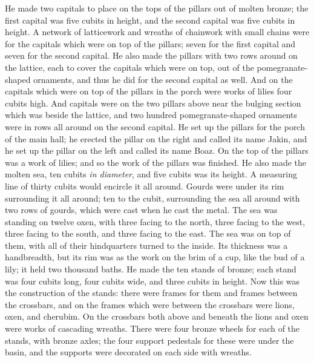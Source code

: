 \begin{biblechapter}
\verse He made two capitals to place on the tops of the pillars out of molten bronze; the first capital was five cubits in height, and the second capital was five cubits in height.
\verse A network of latticework and wreaths of chainwork with small chains were for the capitals which were on top of the pillars; seven for the first capital and seven for the second capital.
\verse He also made the pillars with two rows around on the lattice, each to cover the capitals which were on top, out of the pomegranate-shaped ornaments, and thus he did for the second capital as well.
\verse And on the capitals which were on top of the pillars in the porch were works of lilies four cubits high.
\verse And capitals were on the two pillars above near the bulging section which was beside the lattice, and two hundred pomegranate-shaped ornaments were in rows all around on the second capital.
\verse He set up the pillars for the porch of the main hall; he erected the pillar on the right and called its name Jakin, and he set up the pillar on the left and called its name Boaz.
\verse On the top of the pillars was a work of lilies; and so the work of the pillars was finished.
\verse He also made the molten sea, ten cubits \textit{in diameter}, and five cubits was its height. A measuring line of thirty cubits would encircle it all around.
\verse Gourds were under its rim surrounding it all around; ten to the cubit, surrounding the sea all around with two rows of gourds, which were cast when he cast the metal.
\verse The sea was standing on twelve oxen, with three facing to the north, three facing to the west, three facing to the south, and three facing to the east. The sea was on top of them, with all of their hindquarters turned to the inside.
\verse Its thickness was a handbreadth, but its rim was as the work on the brim of a cup, like the bud of a lily; it held two thousand baths.
\verse He made the ten stands of bronze; each stand was four cubits long, four cubits wide, and three cubits in height.
\verse Now this was the construction of the stands: there were frames for them and frames between the crossbars,
\verse and on the frames which were between the crossbars were lions, oxen, and cherubim. On the crossbars both above and beneath the lions and oxen were works of cascading wreaths.
\verse There were four bronze wheels for each of the stands, with bronze axles; the four support pedestals for these were under the basin, and the supports were decorated on each side with wreaths.

\end{biblechapter}

